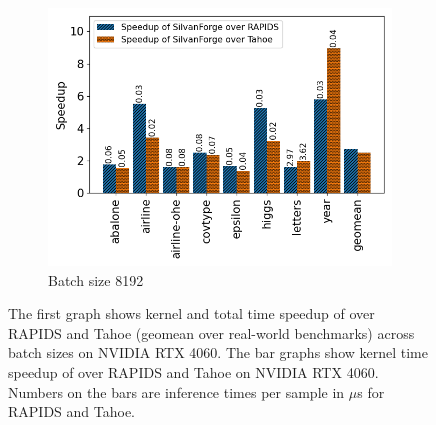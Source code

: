 \begin{figure}[htb]
\begin{subfigure}[t]{.32\linewidth}
      \includegraphics[width=\textwidth]{figures/speedup_bar_graph_8192.png}
      \caption{\label{Fig:KernelTimeIndividualBenchmarks4060b} Batch size 8192}
    \end{subfigure}
    \caption{The first graph shows kernel and total time speedup of \Treebeard{} over RAPIDS and Tahoe (geomean over real-world 
    benchmarks) across batch sizes on NVIDIA RTX 4060. The bar graphs show kernel time speedup of \Treebeard{} over RAPIDS and Tahoe 
    on NVIDIA RTX 4060. Numbers on the bars are inference times per sample in $\mu$s for RAPIDS and Tahoe.}
\end{figure}




